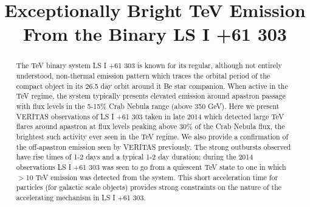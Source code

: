 \documentclass[preprint2]{aastex}
\begin{document}

\title{Exceptionally Bright TeV Emission From the Binary LS I +61 303}


\author{}
\affil{}





\begin{abstract}
The TeV binary system LS I +61 303 is known for its regular, although not entirely understood, non-thermal emission pattern which traces the orbital period of the compact object in its 26.5 day orbit around it Be star companion. When active in the TeV regime, the system typically presents elevated emission around apastron passage with flux levels in the 5-15$\%$ Crab Nebula range (above 350 GeV). Here we present VERITAS observations of LS I +61 303 taken in late 2014 which detected large TeV flares around apastron at flux levels peaking above 30$\%$ of the Crab Nebula flux, the brightest such activity ever seen in the TeV regime. We also provide a confirmation of the off-apastron emission seen by VERITAS previously. The strong outbursts observed have rise times of 1-2 days and a typical 1-2 day duration; during the 2014 observations LS I +61 303 was seen to go from a quiescent TeV state to one in which $>$10 TeV emission was detected from the system. This short acceleration time for particles (for galactic scale objects) provides strong constraints on the nature of the accelerating mechanism in LS I +61 303.


\end{abstract}
\end{document}

